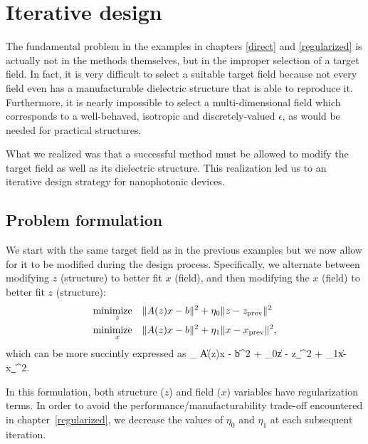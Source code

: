 \chapter{Iterative design} \label{iterative}
The fundamental problem in the examples 
    in chapters \ref{direct} and \ref{regularized}
    is actually not in the methods themselves, 
    but in the improper selection of a target field. 
In fact, it is very difficult to select a suitable target field 
    because not every field even has a manufacturable dielectric structure 
    that is able to reproduce it. 
Furthermore, it is nearly impossible to select a multi-dimensional field 
    which corresponds to a well-behaved, isotropic and 
    discretely-valued $\epsilon$, 
    as would be needed for practical structures. 

What we realized was that a successful method 
    must be allowed to modify the target field as well as 
    its dielectric structure.
This realization led us to an iterative design strategy for nanophotonic devices.

\section{Problem formulation}
We start with the same target field as in the previous examples 
    but we now allow for it to be modified during the design process. 
Specifically, we alternate between modifying $z$ (structure) 
    to better fit $x$ (field), 
    and then modifying the $x$ (field) to better fit $z$ (structure):
    \begin{subequations}\begin{align} 
    \operatorname*{\text{minimize}\quad}_z & \|A(z)x - b\|^2 + \eta_0\|z - z_\text{prev}\|^2 \\
    \operatorname*{\text{minimize}\quad}_x & \|A(z)x - b\|^2 + \eta_1\|x - x_\text{prev}\|^2,
    \end{align}\end{subequations}
which can be more succintly expressed as 
    \BE \minimize_ 
        \|A(z)x - b\|^2 + \eta_0\|z - z_\|^2
                        + \eta_1\|x-x_\|^2. \label{iterative problem}\EE

In this formulation, both structure ($z$) and field ($x$) variables
    have regularization terms.
In order to avoid the performance/manufacturability trade-off 
    encountered in chapter~\ref{regularized},
    we decrease the values of $\eta_0$ and $\eta_1$ at each subsequent iteration.

